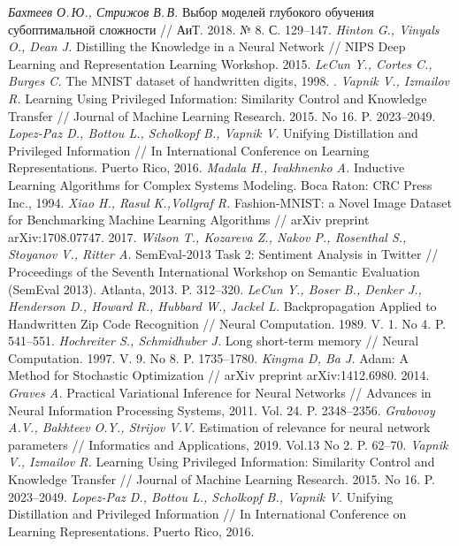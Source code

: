 \documentclass[12pt]{a&t}
\begin{document}
\begin{thebibliography}{10}
	\textit{Бахтеев О.\,Ю., Стрижов В.\,В.} Выбор моделей глубокого обучения субоптимальной сложности // АиТ. 2018. № 8. С. 129--147.
        \textit{Hinton G., Vinyals O., Dean J.} Distilling the Knowledge in a Neural Network // NIPS Deep Learning and Representation Learning Workshop. 2015.
	\textit{LeCun Y.,  Cortes C., Burges C.} The MNIST dataset of handwritten digits, 1998. .
	\textit{Vapnik V., Izmailov R.} Learning Using Privileged Information: Similarity Control and Knowledge Transfer // Journal of Machine Learning Research. 2015. No 16. P. 2023--2049.
	\textit{Lopez-Paz D., Bottou L., Scholkopf B., Vapnik V.} Unifying Distillation and Privileged Information // In International Conference on Learning Representations. Puerto Rico, 2016.
	\textit{Madala H., Ivakhnenko A.} Inductive Learning Algorithms for Complex Systems Modeling. Boca Raton: CRC Press Inc., 1994.
	\textit{Xiao H., Rasul K.,Vollgraf R.} Fashion-MNIST: a Novel Image Dataset for Benchmarking Machine Learning Algorithms // arXiv preprint arXiv:1708.07747. 2017.
	\textit{Wilson T., Kozareva Z., Nakov P., Rosenthal S., Stoyanov V., Ritter A.} {S}em{E}val-2013 Task 2: Sentiment Analysis in Twitter // Proceedings of the Seventh International Workshop on Semantic Evaluation ({S}em{E}val 2013). Atlanta, 2013. P. 312--320.
	\textit{LeCun Y., Boser B., Denker J., Henderson D., Howard R., Hubbard W., Jackel L.} Backpropagation Applied to Handwritten Zip Code Recognition // Neural Computation. 1989. V. 1. No 4. P. 541--551.
	\textit{Hochreiter S., Schmidhuber J.} Long short-term memory // Neural Computation. 1997. V. 9. No 8.  P. 1735--1780.
	\textit{Kingma D, Ba J.} Adam: A Method for Stochastic Optimization // arXiv preprint arXiv:1412.6980. 2014.
	\textit{Graves A.} Practical Variational Inference for Neural Networks // Advances in Neural Information Processing Systems, 2011. Vol. 24. P. 2348--2356.
	\textit{Grabovoy A.V., Bakhteev O.Y., Strijov V.V.} Estimation of relevance for neural network parameters // Informatics and Applications, 2019. Vol.13 No 2. P. 62--70.
	\textit{Vapnik V., Izmailov R.} Learning Using Privileged Information: Similarity Control and Knowledge Transfer // Journal of Machine Learning Research. 2015. No 16. P. 2023--2049.
	\textit{Lopez-Paz D., Bottou L., Scholkopf B., Vapnik V.} Unifying Distillation and Privileged Information // In International Conference on Learning Representations. Puerto Rico, 2016.
 \end{thebibliography}
\end{document}
